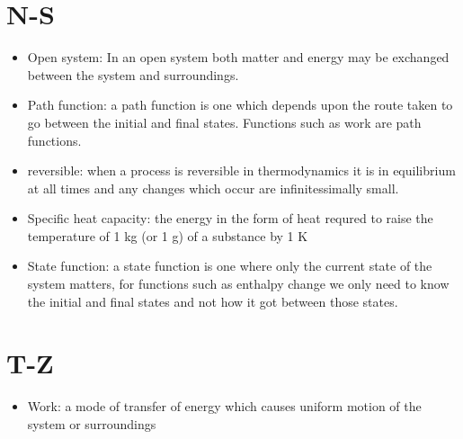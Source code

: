 \documentclass[
]{book}
\providecommand{\tightlist}{%
  \setlength{\itemsep}{0pt}\setlength{\parskip}{0pt}}
\begin{document}
\hypertarget{n-s}{%
\section*{N-S}\label{n-s}}

\begin{itemize}
\item
  Open system: In an open system both matter and energy may be exchanged between the system and surroundings.
\item
  Path function: a path function is one which depends upon the route taken to go between the initial and final states. Functions such as work are path functions.
\item
  reversible: when a process is reversible in thermodynamics it is in equilibrium at all times and any changes which occur are infinitessimally small.
\item
  Specific heat capacity: the energy in the form of heat requred to raise the temperature of 1 kg (or 1 g) of a substance by 1 K
\item
  State function: a state function is one where only the current state of the system matters, for functions such as enthalpy change we only need to know the initial and final states and not how it got between those states.
\end{itemize}

\hypertarget{t-z}{%
\section*{T-Z}\label{t-z}}

\begin{itemize}
\tightlist
\item
  Work: a mode of transfer of energy which causes uniform motion of the system or surroundings
\end{itemize}

  
\end{document}
